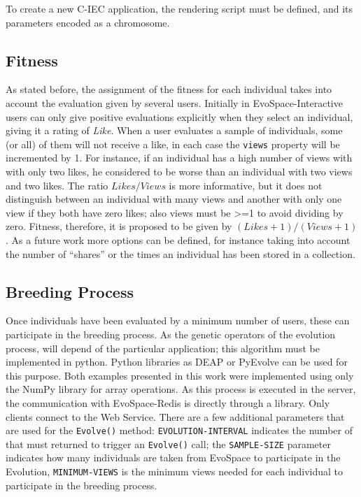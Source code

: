 \documentclass{sig-alternate}
\begin{document}
To create a new C-IEC application, the  rendering script must be defined, and its parameters encoded as a chromosome.


\subsection{Fitness}
As stated before, the assignment of the fitness for each individual takes into account the evaluation given by several users. Initially in EvoSpace-Interactive users can only give positive evaluations explicitly when they select an individual, giving it a rating of \emph{Like}.
When a user evaluates a sample of individuals, some (or all) of them will not receive a like, in each case the \texttt{views} property will be incremented by 1. For instance, if an individual has a high number of views with with only two likes, he considered to be  worse than an individual with two views and two likes. The ratio $Likes/Views$ is more informative, but it does not distinguish between an individual with many views and another with only
one view if they both have zero likes; also views must be >=1 to avoid dividing by zero. Fitness, therefore, it is proposed to be given by $(Likes+1)/(Views+1)$. As a future work more options can be defined, for instance taking into account the number of ``shares'' or the times an individual has been stored in a collection.

\subsection{Breeding Process}

Once individuals have been evaluated by a minimum number of users, these can participate in the breeding process. As the genetic operators of the evolution process, will depend of the particular application; this algorithm must be implemented in python. Python libraries as DEAP or PyEvolve can be used for this purpose. Both examples presented in this work were implemented using only the NumPy library for array operations. As this process is executed in the server, the communication with EvoSpace-Redis is directly through a library. Only clients connect to the Web Service. There are a few additional parameters that are used for the \texttt{Evolve()} method: \texttt{EVOLUTION-INTERVAL} indicates the number of that must returned to trigger an \texttt{Evolve()} call; the  \texttt{SAMPLE-SIZE} parameter indicates how many individuals are taken from EvoSpace to participate in the Evolution, \texttt{MINIMUM-VIEWS} is the minimum views needed for each individual to participate in the breeding process.
\end{document}

